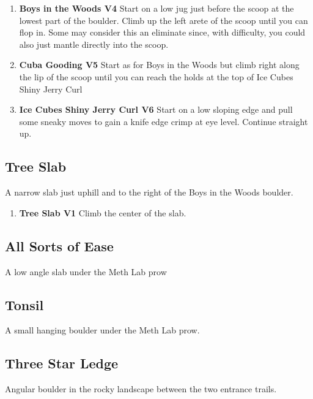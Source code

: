 \begin{enumerate}[resume]
	\item\label{rt:Boys in the Woods} \colorbox{RoyalBlue!20}{\textbf{Boys in the Woods V4     } }
	\newline Start on a low jug just before the scoop at the lowest part of the boulder. Climb up the left arete of the scoop until you can flop in. Some may consider this an eliminate since, with difficulty, you could also just mantle directly into the scoop.\
	\item\label{rt:Cuba Gooding} \colorbox{RoyalBlue!20}{\textbf{Cuba Gooding V5  } }
	\newline Start as for Boys in the Woods but climb right along the lip of the scoop until you can reach the holds at the top of Ice Cubes Shiny Jerry Curl\
	\item\label{rt:Ice Cubes Shiny Jerry Curl} \colorbox{Goldenrod!50}{\textbf{Ice Cubes Shiny Jerry Curl V6  } }
	\newline Start on a low sloping edge and pull some sneaky moves to gain a knife edge crimp at eye level. Continue straight up.\
\end{enumerate}
\subsection*{Tree Slab}\label{bf:Tree Slab}
A narrow slab just uphill and to the right of the Boys in the Woods boulder.

\begin{enumerate}[resume]
	\item\label{rt:Tree Slab} \colorbox{green!20}{\textbf{Tree Slab V1     } }
	\newline Climb the center of the slab.\
\end{enumerate}
\subsection*{All Sorts of Ease}\label{bf:All Sorts of Ease}
A low angle slab under the Meth Lab prow

\subsection*{Tonsil}\label{bf:Tonsil}
A small hanging boulder under the Meth Lab prow.

\subsection*{Three Star Ledge}\label{bf:Three Star Ledge}
Angular boulder in the rocky landscape between the two entrance trails.

